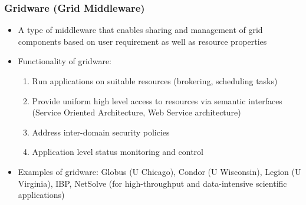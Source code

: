 \documentclass{article}
\begin{document}
\subsubsection{Gridware (Grid Middleware)}
\begin{itemize}
    \item A type of middleware that enables sharing and management of grid components based on user requirement as well as resource properties 
    
    \item Functionality of gridware:
    \begin{enumerate}
        \item Run applications on suitable resources (brokering, scheduling tasks)
        
        \item Provide uniform high level access to resources via semantic interfaces (Service Oriented Architecture, Web Service architecture)
        
        \item Address inter-domain security policies 
        
        \item Application level status monitoring and control
        
    \end{enumerate}
    
    \item Examples of gridware: Globus (U Chicago), Condor (U Wisconsin), Legion (U Virginia), IBP, NetSolve (for high-throughput and data-intensive scientific applications)
\end{itemize}
\end{document}
